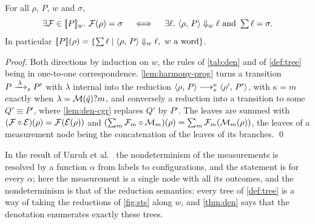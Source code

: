 \begin{theorem}[Correspondence]\label{thm:den}
For all $\rho$, $P$, $w$ and $\sigma$,
\[
\exists \sop{F} \in \denw{P}{w}.\ \sop{F}(\rho) = \sigma
\quad\iff\quad
\exists \ell.\ \tree{\conf{\rho}{P}}{w}{\ell}{} \text{ and } \textstyle\sum \ell = \sigma .
\]
In particular $\llbracket P \rrbracket(\rho) = \{ \sum \ell \mid \langle \rho ,\, P \rangle \Downarrow_{w} \ell,\ w \text{ a word} \}$.
\end{theorem}

\begin{proof}
Both directions by induction on $w$, the rules of \cref{tab:den} and of
\cref{def:tree} being in one-to-one correspondence. \cref{lem:harmony-prog}
turns a transition $P \xrightarrow{\;\lambda\;}_{s} P'$ with $\lambda$ internal into the
reduction $\langle \rho ,\, P \rangle \longrightarrow_{s}^{\kappa} \langle \rho' ,\, P' \rangle$, with
$\kappa = m$ exactly when $\lambda = \mathcal{M}(\tilde q)?m$, and conversely a reduction
into a transition to some $Q' \equiv P'$, where \cref{lem:den-cgr} replaces
$Q'$ by $P'$. The leaves are summed with
$(\mathcal{F} \circ \mathcal{E})(\rho) = \mathcal{F}(\mathcal{E}(\rho))$ and
$(\sum_m \mathcal{F}_m \circ \mathcal{M}_m)(\rho) = \sum_m \mathcal{F}_m(\mathcal{M}_m(\rho))$,
the leaves of a measurement node being the concatenation of the leaves of its
branches.
\qed
\end{proof}

\begin{remark}
In the result of Unruh et al.~\cite[Theorem 3.1]{UVY26} the nondeterminism of the measurements is
resolved by a function $\alpha$ from labels to configurations, and the
statement is for every $\alpha$; here the measurement is a single node with
all its outcomes, and the nondeterminism is that of the reduction semantics:
every tree of \cref{def:tree} is a way of taking the reductions of
\cref{fig:sts} along $w$, and \cref{thm:den} says that the denotation
enumerates exactly these trees.
\end{remark}
